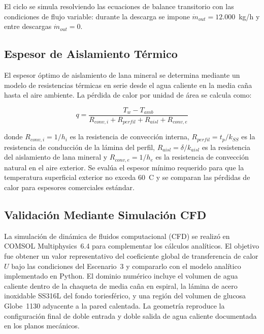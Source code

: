 El ciclo se simula resolviendo las ecuaciones de balance transitorio con las condiciones de flujo variable: durante la descarga se impone $\dot{m}_{out} = 12{.}000$~kg/h y entre descargas $\dot{m}_{out} = 0$.

\subsection{Espesor de Aislamiento T\'ermico}

El espesor \'optimo de aislamiento de lana mineral se determina mediante un modelo de resistencias t\'ermicas en serie desde el agua caliente en la media ca\~na hasta el aire ambiente. La p\'erdida de calor por unidad de \'area se calcula como:

\begin{equation}
q = \frac{T_w - T_{amb}}{R_{conv,i} + R_{perfil} + R_{aisl} + R_{conv,e}}
\label{eq:aislamiento}
\end{equation}

donde $R_{conv,i} = 1/h_i$ es la resistencia de convecci\'on interna, $R_{perfil} = t_p/k_{SS}$ es la resistencia de conducci\'on de la l\'amina del perfil, $R_{aisl} = \delta/k_{aisl}$ es la resistencia del aislamiento de lana mineral y $R_{conv,e} = 1/h_e$ es la resistencia de convecci\'on natural en el aire exterior. Se eval\'ua el espesor m\'inimo requerido para que la temperatura superficial exterior no exceda 60~\textdegree C y se comparan las p\'erdidas de calor para espesores comerciales est\'andar.

\subsection{Validaci\'on Mediante Simulaci\'on CFD}

La simulaci\'on de din\'amica de fluidos computacional (CFD) se realiz\'o en COMSOL Multiphysics~6.4 para complementar los c\'alculos anal\'iticos. El objetivo fue obtener un valor representativo del coeficiente global de transferencia de calor $U$ bajo las condiciones del Escenario~3 y compararlo con el modelo anal\'itico implementado en Python. El dominio num\'erico incluye el volumen de agua caliente dentro de la chaqueta de media ca\~na en espiral, la l\'amina de acero inoxidable SS316L del fondo toriesf\'erico, y una regi\'on del volumen de glucosa Globe~1130 adyacente a la pared calentada. La geometr\'ia reproduce la configuraci\'on final de doble entrada y doble salida de agua caliente documentada en los planos mec\'anicos.

